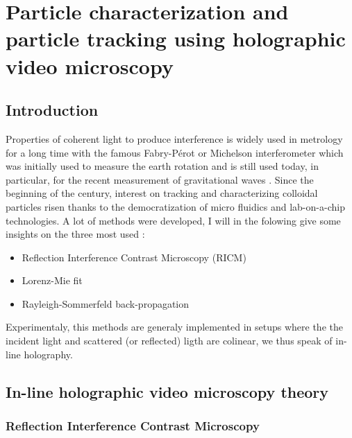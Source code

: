 \newpage
\section{Particle characterization and particle tracking using holographic video microscopy}
		\label{sec:chapter2}

\subsection{Introduction}

Properties of coherent light to produce interference is widely used in metrology for a long time with the famous Fabry-Pérot  \cite{fabry_theorie_1899, perot_application_1899} or Michelson interferometer \cite{michelson_relative_1887} which was initially used to measure the earth rotation and is still used today, in particular, for the recent measurement of gravitational waves
\cite{ligo_scientific_collaboration_and_virgo_collaboration_gw151226_2016}. 
Since the beginning of the century, interest on tracking and characterizing colloidal particles risen thanks to the democratization of micro fluidics and lab-on-a-chip technologies. A lot of methods were developed, I will in the folowing give some insights on the three most used :

\begin{itemize}
	\item Reflection Interference Contrast Microscopy (\gls{RICM})
	\item Lorenz-Mie fit
	\item Rayleigh-Sommerfeld back-propagation
\end{itemize}

Experimentaly, this methods are generaly implemented in setups where the the incident light and scattered (or reflected) ligth are colinear, we thus speak of in-line holography.

\subsection{In-line holographic video microscopy theory}

\subsubsection{Reflection Interference Contrast Microscopy}

